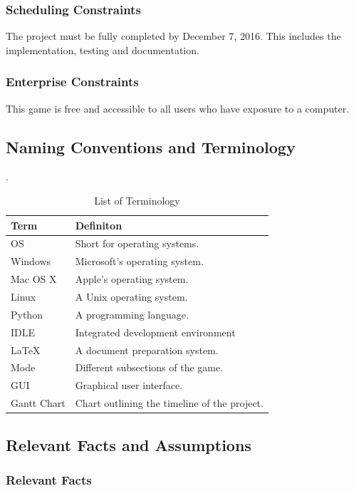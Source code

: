 \documentclass[12pt, titlepage]{article}
\begin{document}
\subsubsection{Scheduling Constraints}
The project must be fully completed by December 7, 2016. This includes the implementation, testing and documentation.

\subsubsection{Enterprise Constraints}
This game is free and accessible to all users who have exposure to a computer. 

\subsection{Naming Conventions and Terminology}
.
\begin{table}[h!]
	\centering
	\caption{List of Terminology}
	\label{tab:table3}
	\begin{tabular}{ll}
		\hline
		Term & Definiton\\
		\hline
		OS & Short for operating systems.\\
		Windows & Microsoft's operating system.\\
		Mac OS X & Apple's operating system.\\
		Linux & A Unix operating system.\\
		Python & A programming language.\\
		IDLE & Integrated development environment\\
		LaTeX & A document preparation system. \\
		Mode & Different subsections of the game.\\
		GUI & Graphical user interface.\\
		Gantt Chart & Chart outlining the timeline of the project.\\
		\hline
	\end{tabular}
\end{table}

\subsection{Relevant Facts and Assumptions}
\subsubsection{Relevant Facts}
\end{document}
